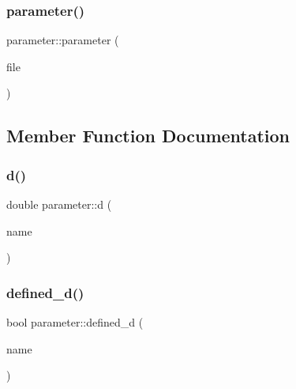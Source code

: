\mbox{\label{classparameter_ae921d41efdb46c59c86ce23b04401a87}} 
\subsubsection{\texorpdfstring{parameter()}{parameter()}\hspace{0.1cm}{\footnotesize\ttfamily [2/2]}}
{\footnotesize\ttfamily parameter\+::parameter (\begin{DoxyParamCaption}\item[{char $\ast$}]{file }\end{DoxyParamCaption})\hspace{0.3cm}{\ttfamily [inline]}}



\subsection{Member Function Documentation}
\mbox{\label{classparameter_a9bde45c6fc27d8ffde9684988c4decee}} 
\subsubsection{\texorpdfstring{d()}{d()}}
{\footnotesize\ttfamily double parameter\+::d (\begin{DoxyParamCaption}\item[{string}]{name }\end{DoxyParamCaption})\hspace{0.3cm}{\ttfamily [inline]}}

\mbox{\label{classparameter_adf70ad9eea8ccf14a49a1c007d8a5d09}} 
\subsubsection{\texorpdfstring{defined\+\_\+d()}{defined\_d()}}
{\footnotesize\ttfamily bool parameter\+::defined\+\_\+d (\begin{DoxyParamCaption}\item[{string}]{name }\end{DoxyParamCaption})\hspace{0.3cm}{\ttfamily [inline]}}

